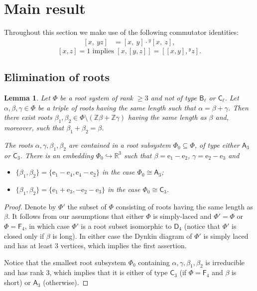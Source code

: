 \documentclass{article}
\numberwithin{equation}{section}
\newtheorem{lemma}{Lemma} \numberwithin{lemma}{section}
\theoremstyle{definition}
\theoremstyle{remark}
\newcommand{\ZZ}{\mathbb{Z}}
\newcommand{\up}[2]{{^{#1}\!{#2}}}
\newcommand{\rA}{\mathsf{A}}
\newcommand{\rB}{\mathsf{B}}
\newcommand{\rC}{\mathsf{C}}
\newcommand{\rD}{\mathsf{D}}
\newcommand{\rF}{\mathsf{F}}
\begin{document}
\section{Main result}
Throughout this section we make use of the following commutator identities:
\begin{align}
\label{eq:comm-mult-rhs}[x,\ yz]& =   [x,\ y] \cdot {}^{y}\![x,\ z],
\end{align}
\begin{equation} \label{eq:HW-corr} [x,z] = 1 \text{ implies } [x, [y,z]] = [[x,y],{}^yz].
\end{equation}

\subsection{Elimination of roots}
\begin{lemma}\label{ThreeRoots}
Let \(\Phi\) be a root system of rank \(\geq 3\) and not of type \(\rB_\ell\) or \(\rC_\ell\). Let \(\alpha, \beta, \gamma \in \Phi\) be a triple of roots having the same length such that $\alpha = \beta + \gamma$.  
Then there exist roots \(\beta_1, \beta_2 \in \Phi \setminus (\ZZ\beta + \ZZ\gamma)\) having the same length as $\beta$ and, moreover, such that \(\beta_1 + \beta_2 = \beta\).

The roots $\alpha, \gamma, \beta_1, \beta_2$ are contained in a root subsystem $\Phi_0 \subseteq \Phi$, of type either \(\rA_3\) or \(\rC_3\). There is an embedding \(\Phi_0 \hookrightarrow  \mathbb R^3\) such that \(\beta = \mathrm e_1 - \mathrm e_2\), \(\gamma = \mathrm e_2 - \mathrm e_3\) and 
\begin{itemize}
 \item \(\{\beta_1, \beta_2\} = \{\mathrm e_1 - \mathrm e_4, \mathrm e_4 - \mathrm e_2\}\) in the case \(\Phi_0\cong\rA_3\);
 \item \(\{\beta_1, \beta_2\} = \{\mathrm e_1 + \mathrm e_3, -\mathrm e_2 - \mathrm e_3\}\) in the case \(\Phi_0\cong\rC_3\).
\end{itemize}
\end{lemma}
\begin{proof}
Denote by $\Phi'$ the subset of $\Phi$ consisting of roots having the same length as $\beta$.
It follows from our assumptions that either $\Phi$ is simply-laced and $\Phi' = \Phi$ or $\Phi = \rF_4$, in which case $\Phi'$ is a root subset isomorphic to $\rD_4$ (notice that $\Phi'$ is closed only if $\beta$ is long). In either case the Dynkin diagram of $\Phi'$ is simply laced and has at least $3$ vertices, which implies the first assertion.

Notice that the smallest root subsystem $\Phi_0$ containing $\alpha, \gamma, \beta_1, \beta_2$ is irreducible and has rank $3$, which implies that it is either of type  $\rC_3$ (if $\Phi = \rF_4$ and $\beta$ is short) or $\rA_3$ (otherwise). \end{proof}
\end{document}
